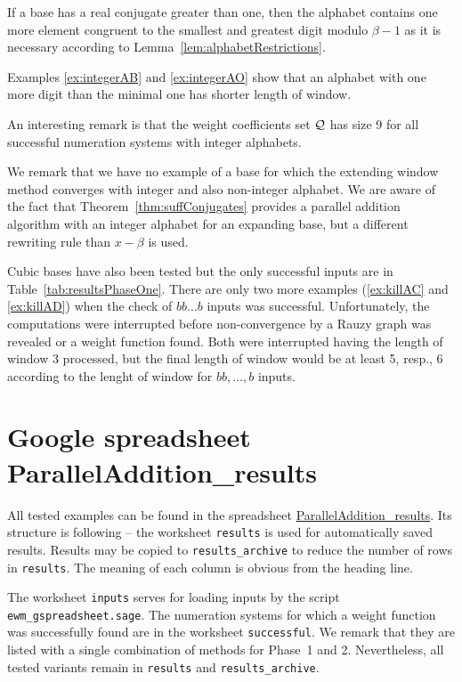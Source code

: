 If a base has a real conjugate greater than one, then the alphabet contains one more element congruent to the smallest and greatest digit modulo $\beta-1$ as it is necessary according to Lemma~\ref{lem:alphabetRestrictions}.

Examples \ref{ex:integerAB} and \ref{ex:integerAO} show that  an alphabet with one more digit than the minimal one has shorter length of window.

An interesting remark is that the weight coefficients set $\mathcal{Q}$ has size 9 for all successful numeration systems with integer alphabets.

We remark that we have no example of a base for which the extending window method converges with integer and also non-integer alphabet. We are aware of the fact that Theorem~\ref{thm:suffConjugates} provides a parallel addition algorithm with an integer alphabet for an expanding base, but  a different rewriting rule than $x-\beta$ is used.



Cubic bases have also been tested but the only successful inputs are in Table~\ref{tab:resultsPhaseOne}. There are only two more examples (\ref{ex:killAC} and \ref{ex:killAD}) when the check of $bb\dots b$ inputs was successful. Unfortunately, the computations were interrupted before non-convergence by a Rauzy graph was revealed or a weight function found. Both were interrupted having the length of window 3 processed, but the final length of window would be at least 5, resp., 6 according to the lenght of window for $bb,\dots,b$ inputs.








\section{Google spreadsheet ParallelAddition\_results}
\label{sec:gspreadsheet}
All tested examples can be found in the spreadsheet \href{https://docs.google.com/spreadsheets/d/1TnhrHdefHfHa0WSeVs4q6XVj3epjPlPlnoekE0E1xeM/edit?usp=sharing}{ParallelAddition\_results}. Its structure is following -- the worksheet \verb+results+ is used for automatically saved results. Results may be copied to \verb+results_archive+ to reduce the number of rows in \verb+results+. The meaning of each column is obvious from the heading line. 

The worksheet \verb+inputs+ serves for loading inputs by the script \verb+ewm_gspreadsheet.sage+. The numeration systems for which a weight function was successfully found are in the worksheet \verb+successful+. We remark that they are listed with a single combination of methods for Phase~1 and 2. Nevertheless, all tested variants remain in \verb+results+ and \verb+results_archive+. 

